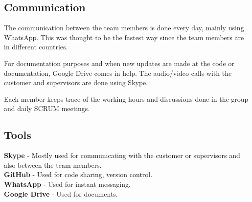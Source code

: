 \subsection{Communication}
The communication between the team members is done every day, mainly using WhatsApp. This was thought to be the fastest way since the team members are in different countries.

For documentation purposes and when new updates are made at the code or documentation, Google Drive comes in help. The audio/video calls with the customer and supervisors are done using Skype.

Each member keeps trace of the working hours and discussions done in the group and daily SCRUM meetings.
\subsection{Tools}
\textbf{Skype} - Mostly used for communicating with the customer or supervisors and also between the team members.\\
\textbf{GitHub} - Used for code sharing, version control.\\
\textbf{WhatsApp} - Used for instant messaging.\\
\textbf{Google Drive} - Used for documents.